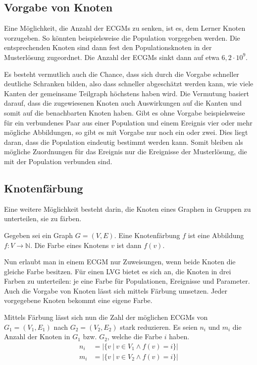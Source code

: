 \subsection{Vorgabe von Knoten}\label{sec:VorgabeKnoten}
Eine Möglichkeit, die Anzahl der ECGMs zu senken, ist es, dem Lerner Knoten 
vorzugeben. So könnten beispielsweise die Population vorgegeben werden. 
Die entsprechenden Knoten sind dann fest den Populationsknoten in der 
Musterlösung zugeordnet. Die Anzahl der ECGMs sinkt dann auf etwa $6{,}2 \cdot 10^9$. 

Es besteht vermutlich auch die Chance, dass sich durch die Vorgabe schneller deutliche 
Schranken bilden, also dass schneller abgeschätzt werden kann, wie viele Kanten der gemeinsame 
Teilgraph höchstens haben wird. Die Vermutung basiert darauf, dass die zugewiesenen Knoten auch 
Auswirkungen auf die Kanten und somit auf die benachbarten Knoten haben. Gibt es ohne 
Vorgabe beispielsweise für ein verbundenes Paar aus einer Population und einem Ereignis 
vier oder mehr mögliche Abbildungen, so gibt es mit Vorgabe nur noch ein oder zwei. 
Dies liegt daran, dass die Population eindeutig bestimmt werden kann. Somit bleiben 
als mögliche Zuordnungen für das Ereignis nur die Ereignisse der Musterlösung, die 
mit der Population verbunden sind.

\subsection{Knotenfärbung}
Eine weitere Möglichkeit besteht darin, die Knoten eines Graphen in Gruppen zu 
unterteilen, sie zu färben.

\begin{mydef}[Knotenfärbung]
Gegeben sei ein Graph $G=(V,E)$. Eine Knotenfärbung $f$ ist eine Abbildung 
$f: V \rightarrow \mathbb{N}$. Die Farbe eines Knotens $v$ ist dann $f(v)$.
\end{mydef}

Nun erlaubt man in einem ECGM nur Zuweisungen, wenn beide Knoten die gleiche Farbe 
besitzen. Für einen LVG bietet es sich an, die Knoten in drei Farben zu unterteilen: 
je eine Farbe für Populationen, Ereignisse und Parameter. Auch die Vorgabe von Knoten 
lässt sich mittels Färbung umsetzen. Jeder vorgegebene Knoten bekommt eine eigene Farbe. 

Mittels Färbung lässt sich nun die Zahl der möglichen ECGMs von $G_1=(V_1,E_1)$ nach 
$G_2=(V_2,E_2)$ stark reduzieren. Es seien $n_i$ und $m_i$ die Anzahl der Knoten in $G_1$ 
bzw. $G_2$, welche die Farbe $i$ haben.
\begin{align*}
n_i&=\big| \{v\ |\ v \in V_1 \wedge f(v)=i\}\big| \\
m_i&=\big| \{v\ |\ v \in V_2 \wedge f(v)=i\}\big| 
\end{align*}

